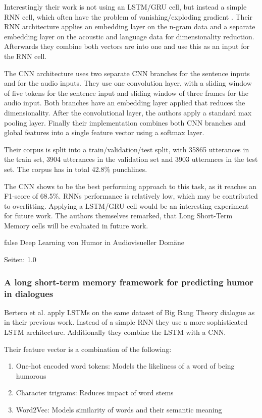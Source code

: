 \documentclass[draft,final,oneside]{vutinfth} %
\begin{document}
Interestingly their work is not using an LSTM/GRU cell, but instead a simple RNN cell, which often have the problem of vanishing/exploding gradient \cite{hochreiter}. Their RNN architecture applies an embedding layer on the n-gram data and a separate embedding layer on the acoustic and language data for dimensionality reduction. Afterwards they combine both vectors are into one and use this as an input for the RNN cell.

The CNN architecture uses two separate CNN branches for the sentence inputs and for the audio inputs. They use one convolution layer, with a sliding window of five tokens for the sentence input and sliding window of three frames for the audio input. Both branches have an embedding layer applied that reduces the dimensionality. After the convolutional layer, the authors apply a standard max pooling layer. Finally their implementation combines both CNN branches and global features into a single feature vector using a softmax layer.

Their corpus is split into a train/validation/test split, with 35865 utterances in the train set, 3904 utterances in the validation set and 3903 utterances in the test set. The corpus has in total 42.8\% punchlines.

The CNN shows to be the best performing approach to this task, as it reaches an F1-score of 68.5\%. RNNs performance is relatively low, which may be contributed to overfitting. Applying a LSTM/GRU cell would be an interesting experiment for future work. The authors themselves remarked, that Long Short-Term Memory cells will be evaluated in future work.

\if false
Deep Learning von Humor in Audiovisueller Domäne

Seiten: 1.0

\cite{Bertero2016DeepLO}
\fi

\subsubsection{A long short-term memory framework for predicting humor in dialogues \cite{bertero2016long}}

Bertero et al. apply LSTMs on the same dataset of Big Bang Theory dialogue as in their previous work. \cite{Bertero2016DeepLO} Instead of a simple RNN they use a more sophisticated LSTM architecture. Additionally they combine the LSTM with a CNN.

Their feature vector is a combination of the following:
\begin{enumerate}

\item One-hot encoded word tokens: Models the likeliness of a word of being humorous
\item Character trigrams: Reduces impact of word stems
\item Word2Vec: Models similarity of words and their semantic meaning

\end{enumerate}
\end{document}
